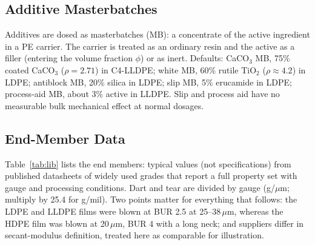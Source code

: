 \documentclass[conference,a4paper]{IEEEtran}
\newcommand{\um}{\,$\mu$m}
\begin{document}
\subsection{Additive Masterbatches}
Additives are dosed as masterbatches (MB): a concentrate of the active ingredient in a PE carrier. The carrier is treated as an ordinary resin and the active as a filler (entering the volume fraction $\phi$) or as inert. Defaults: CaCO$_3$ MB, 75\% coated CaCO$_3$ ($\rho=2.71$) in C4-LLDPE; white MB, 60\% rutile TiO$_2$ ($\rho\approx4.2$) in LDPE; antiblock MB, 20\% silica in LDPE; slip MB, 5\% erucamide in LDPE; process-aid MB, about 3\% active in LLDPE. Slip and process aid have no measurable bulk mechanical effect at normal dosages.

\subsection{End-Member Data}
Table~\ref{tab:lib} lists the end members: typical values (not specifications) from published datasheets of widely used grades that report a full property set with gauge and processing conditions. Dart and tear are divided by gauge (g/$\mu$m; multiply by 25.4 for g/mil). Two points matter for everything that follows: the LDPE and LLDPE films were blown at BUR 2.5 at 25--38\um, whereas the HDPE film was blown at 20\um, BUR 4 with a long neck; and suppliers differ in secant-modulus definition, treated here as comparable for illustration.
\end{document}

